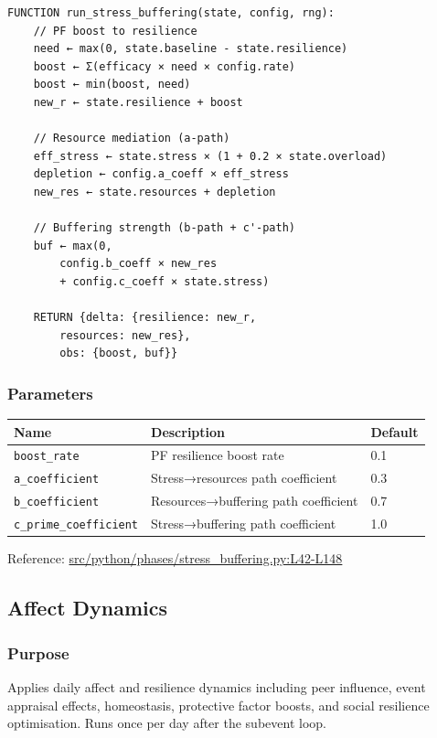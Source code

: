 \documentclass[
  letterpaper,
  DIV=11,
  numbers=noendperiod]{scrartcl}
\newcommand{\trow}[3]{%
  \texttt{\allowbreak #1} & #2 & #3 \\
}
\begin{document}
\begin{verbatim}
FUNCTION run_stress_buffering(state, config, rng):
    // PF boost to resilience
    need ← max(0, state.baseline - state.resilience)
    boost ← Σ(efficacy × need × config.rate)
    boost ← min(boost, need)
    new_r ← state.resilience + boost

    // Resource mediation (a-path)
    eff_stress ← state.stress × (1 + 0.2 × state.overload)
    depletion ← config.a_coeff × eff_stress
    new_res ← state.resources + depletion

    // Buffering strength (b-path + c'-path)
    buf ← max(0,
        config.b_coeff × new_res
        + config.c_coeff × state.stress)

    RETURN {delta: {resilience: new_r,
        resources: new_res},
        obs: {boost, buf}}
\end{verbatim}

\subsubsection{Parameters}\label{parameters-5}

\begin{tabularx}{\textwidth}{p{4.5cm}Xp{2cm}}
\toprule
\textbf{Name} & \textbf{Description} & \textbf{Default} \\
\midrule
\trow{boost\_rate}{PF resilience boost rate}{0.1}
\trow{a\_coefficient}{Stress→resources path coefficient}{0.3}
\trow{b\_coefficient}{Resources→buffering path coefficient}{0.7}
\trow{c\_prime\_coefficient}{Stress→buffering path coefficient}{1.0}
\bottomrule
\end{tabularx}

Reference:
\href{https://github.com/namakala/abm-simulation/blob/84ff9b37fb0c569bef9f122e789d9c23a89348ec/src/python/phases/stress_buffering.py\#L42-L148}{src/python/phases/stress\_buffering.py:L42-L148}

\subsection{Affect Dynamics}\label{affect-dynamics}

\subsubsection{Purpose}\label{purpose-8}

Applies daily affect and resilience dynamics including peer influence,
event appraisal effects, homeostasis, protective factor boosts, and
social resilience optimisation. Runs once per day after the subevent
loop.
\end{document}
